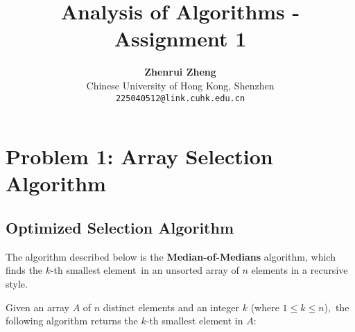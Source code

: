 \documentclass[11pt, a4paper, oneside]{memoir}
\title{\huge\textbf{Analysis of Algorithms - Assignment 1}\vspace{-0.5cm}}
\author{\textbf{Zhenrui Zheng} \vspace{0.5cm} \\ \small Chinese University of Hong Kong, Shenzhen \\ \small\texttt{225040512@link.cuhk.edu.cn}}
\date{}
\begin{document}
\begin{titlingpage}
\maketitle
\renewcommand{\contentsname}{\huge Contents \vspace{-1cm}}
\begin{KeepFromToc} %
\tableofcontents
\end{KeepFromToc}
\end{titlingpage}

\chapter{Problem 1: Array Selection Algorithm}

\section{Optimized Selection Algorithm}
The algorithm described below is the \textbf{Median-of-Medians} algorithm, which finds the $k$-th smallest element\
in an unsorted array of $n$ elements in a recursive style.

Given an array $A$ of $n$ distinct elements and an integer $k$ (where $1 \le k \le n$),\
the following algorithm returns the $k$-th smallest element in $A$:
\end{document}
